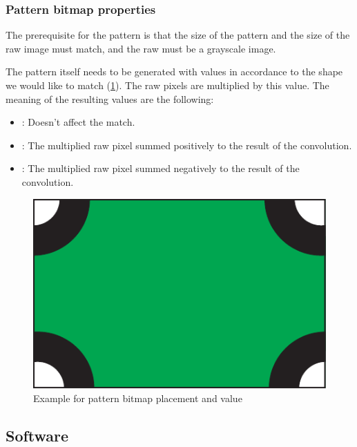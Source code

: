 \subsubsection{Pattern bitmap properties}

The prerequisite for the pattern is that the size of the pattern and the size of the raw image must match, and the raw must be a grayscale image.

The pattern itself needs to be generated with values in accordance to the shape we would like to match (\cref{fig:case_study:convoluter_image}). The raw pixels are multiplied by this value. The meaning of the resulting values are the following: 
\begin{itemize}
	\item {}: Doesn't affect the match.
	\item {}: The multiplied raw pixel summed positively to the result of the convolution.
	\item {}: The multiplied raw pixel summed negatively to the result of the convolution.
\end{itemize}

\begin{figure}[h]
	\centering
	\includegraphics[valign=c,width=.5\linewidth]{include/figures/chapter_6/math_2}
	\caption{Example for pattern bitmap placement and value}
	\label{fig:case_study:convoluter_image}
\end{figure}

\subsection{Software}

